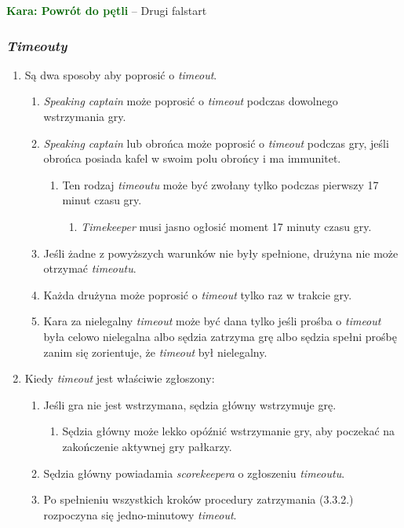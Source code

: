 \documentclass[11pt,a4paper]{article}
\newcommand\penaltyd[2]{\bgroup\textcolor{darkgreen}{\textbf{Kara: #1}} -- #2}
\begin{document}
\penaltyd{Powrót do pętli}{Drugi falstart}

\subsubsection{\emph{Timeouty}}
\begin{enumerate}
  \item Są dwa sposoby aby poprosić o \emph{timeout}.
  \begin{enumerate}
    \item \emph{Speaking captain} może poprosić o \emph{timeout} podczas dowolnego wstrzymania gry.
    \item \emph{Speaking captain} lub obrońca może poprosić o \emph{timeout} podczas gry, jeśli obrońca posiada kafel w swoim polu obrońcy i ma immunitet.
    \begin{enumerate}
      \item Ten rodzaj \emph{timeoutu} może być zwołany tylko podczas pierwszy 17 minut czasu gry.
      \begin{enumerate}
        \item \emph{Timekeeper} musi jasno ogłosić moment 17 minuty czasu gry.
      \end{enumerate}
    \end{enumerate}
    \item Jeśli żadne z powyższych warunków nie były spełnione, drużyna nie może otrzymać \emph{timeoutu}.
    \item Każda drużyna może poprosić o \emph{timeout} tylko raz w trakcie gry.
    \item Kara za nielegalny \emph{timeout} może być dana tylko jeśli prośba o \emph{timeout} była celowo nielegalna albo sędzia zatrzyma grę albo sędzia spełni prośbę zanim się zorientuje, że \emph{timeout} był nielegalny.
  \end{enumerate}
  \item Kiedy \emph{timeout} jest właściwie zgłoszony:
  \begin{enumerate}
    \item Jeśli gra nie jest wstrzymana, sędzia główny wstrzymuje grę.
    \begin{enumerate}
      \item Sędzia główny może lekko opóźnić wstrzymanie gry, aby poczekać na zakończenie aktywnej gry pałkarzy.
    \end{enumerate}
    \item Sędzia główny powiadamia \emph{scorekeepera} o zgłoszeniu \emph{timeoutu}.
    \item Po spełnieniu wszystkich kroków procedury zatrzymania (3.3.2.) rozpoczyna się jedno-minutowy \emph{timeout}. %

\end{enumerate}
\end{enumerate}
\end{document}
